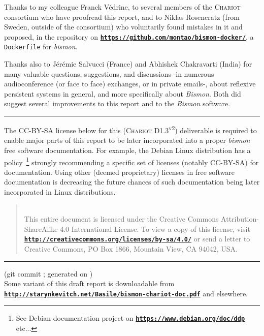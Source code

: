 \documentclass[11pt,a4paper,svgnames]{article}
\newcommand{\bmurl}[1]{{\href{#1}{\texttt{\textbf{#1}}}}}
\begin{document}
Thanks to my colleague Franck Védrine, to several members of the \textsc{Chariot} consortium who have
proofread this report, and to Niklas Rosencratz (from Sweden, outside
of the consortium) who voluntarily found mistakes in it and proposed,
in the repository on \bmurl{https://github.com/montao/bismon-docker/},
a \texttt{Dockerfile} for \emph{bismon}.

Thanks also to Jérémie Salvucci (France) and Abhishek Chakravarti
(India) for many valuable questions, suggestions, and discussions -in
numerous audioconference (or face to face) exchanges, or in private
emails-, about reflexive persistent systems in general, and more
specifically about \emph{Bismon}. Both did suggest several
improvements to this report and to the \emph{Bismon} software.

\medskip

\hrule 

\medskip

\vspace{2cm}

\bigskip

The CC-BY-SA license below for this (\textsc{Chariot}
D1.3\textsuperscript{v2}) deliverable is required to enable major parts
of this report to be later incorporated into a proper
\emph{bismon} free software documentation. For example, the Debian
Linux distribution has a policy~\footnote{See Debian documentation
  project on \bmurl{https://www.debian.org/doc/ddp} etc...} strongly
recommending a specific set of licenses (notably CC-BY-SA) for
documentation. Using other (deemed proprietary) licenses in free
software documentation is decreasing the future chances of such
documentation being later incorporated in Linux distributions.

\begin{quote}
    \\
    This entire document
is licensed under the Creative Commons Attribution-ShareAlike 4.0
International License. To view a copy of this license, visit
\bmurl{http://creativecommons.org/licenses/by-sa/4.0/} or send a letter to
Creative Commons, PO Box 1866, Mountain View, CA 94042, USA.
\end{quote}

\bigskip

\vspace{2cm}

\bigskip

\hrule 

\medskip

\begin{flushright}
  \begin{relsize}{-1}
    (git commit \texttt{\bmgitcommit}; generated on
    \textit{\bmdoctimestamp})\\
    Some variant of this draft report is
    downloadable from \bmurl{http://starynkevitch.net/Basile/bismon-chariot-doc.pdf} and
    elsewhere.
  \end{relsize}
\end{flushright}
\end{document}
